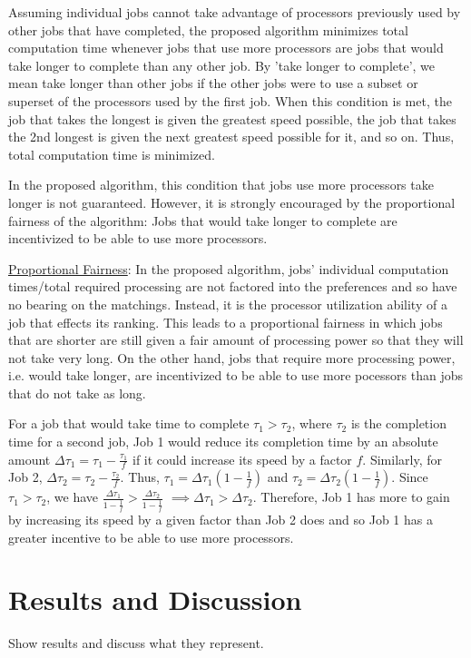 \documentclass[conference]{IEEEtran}
\begin{document}
Assuming individual jobs cannot take advantage
of processors previously used by other jobs
that have completed, 
the proposed algorithm minimizes total 
computation time whenever 
jobs that use more processors are jobs that would take 
longer to complete than any other job. 
By 'take longer to complete', we mean take longer than
other jobs if the other jobs were to use a subset or 
superset of the processors used by the first job.
When this condition is met, the job that takes the
longest is given the greatest speed possible, the job that 
takes the 2nd longest is given the next greatest speed 
possible for it, and so on. 
Thus, total computation time is minimized.

In the proposed algorithm, this condition that jobs use
more processors take longer is not guaranteed.
However, it is strongly encouraged by the 
proportional fairness of the algorithm:
Jobs that would take longer to complete are incentivized
to be able to use more processors.

\underline{Proportional Fairness}:
In the proposed algorithm, jobs' individual computation
times/total required processing are not factored into
the preferences and so have no bearing on the matchings.
Instead, it is the processor utilization ability of 
a job that effects its ranking. This leads to a proportional
fairness in which jobs that are shorter are still given 
a fair amount of processing power so that they will not take
very long. 
On the other hand, jobs that
require more processing power, i.e. would take longer,
are incentivized to be able to use more pocessors than 
jobs that do not take as long.

For a job that would take time to complete 
\(\tau_1 > \tau_2\), where \(\tau_2\) is the
completion time for a second job,
Job 1 would reduce its completion time by an 
absolute amount 
\(\Delta \tau_1 = \tau_1-\frac{\tau_1}{f}\) 
if it could increase its speed by a factor \(f\).
Similarly, for Job 2, 
\(\Delta \tau_2 = \tau_2-\frac{\tau_2}{f}\).
Thus, 
\(\tau_1=\Delta \tau_1(1-\frac{1}{f})\)
and
\(\tau_2=\Delta \tau_2(1-\frac{1}{f})\).
Since 
\(\tau_1 > \tau_2\), we have
\(\frac{\Delta\tau_1}{1-\frac{1}{f}} > \frac{\Delta\tau_2}{1-\frac{1}{f}}\) 
\(\implies \Delta \tau_1 > \Delta \tau_2\).
Therefore, Job 1 has more to gain by increasing its speed by 
a given factor than Job 2 does and so Job 1 has a greater incentive
to be able to use more processors.




\section{Results and Discussion}
Show results and discuss what they represent.
\end{document}
